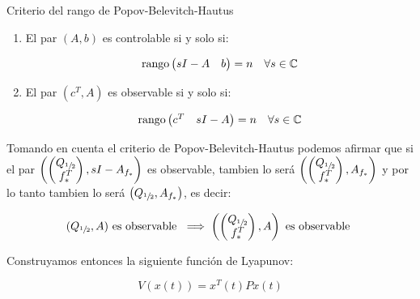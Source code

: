         \begin{nota}
            Criterio del rango de Popov-Belevitch-Hautus
            \begin{enumerate}[i]
                \item El par $(A, b)$ es controlable si y solo si:

                \begin{equation*}
                    \operatorname{rango}{\begin{pmatrix} sI - A & b \end{pmatrix}} = n \quad \forall s \in \mathbb{C}
                \end{equation*}

                \item El par $(c^T, A)$ es observable si y solo si:

                \begin{equation*}
                    \operatorname{rango}{\begin{pmatrix} c^T & sI - A \end{pmatrix}} = n \quad \forall s \in \mathbb{C}
                \end{equation*}
            \end{enumerate}
        \end{nota}

        Tomando en cuenta el criterio de Popov-Belevitch-Hautus podemos afirmar que si el par $\left( \begin{pmatrix} Q_{\sfrac{1}{2}} \\ f_*^T \end{pmatrix} , sI - A_{f_*} \right)$ es observable, tambien lo será $\left( \begin{pmatrix} Q_{\sfrac{1}{2}} \\ f_*^T \end{pmatrix} , A_{f_*} \right)$ y por lo tanto tambien lo será $\left( Q_{\sfrac{1}{2}} , A_{f_*} \right)$, es decir:

        \begin{equation*}
            (Q_{\sfrac{1}{2}}, A) \text{ es observable } \implies \left( \begin{pmatrix}Q_{\sfrac{1}{2}} \\ f_*^T \end{pmatrix}, A \right) \text{ es observable }
        \end{equation*}

        Construyamos entonces la siguiente función de Lyapunov:

        \begin{equation}
            V(x(t)) = x^T(t) P x(t)
        \end{equation}

